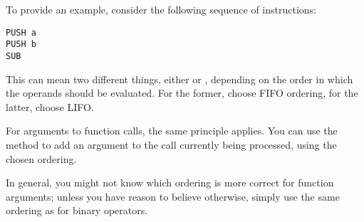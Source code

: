 To provide an example, consider the following sequence of instructions:

\begin{bytecode}
\begin{lstlisting}
PUSH a
PUSH b
SUB
\end{lstlisting}
\end{bytecode}

This can mean two different things, either  or , depending on the order in which the operands should be evaluated. For the former, choose FIFO ordering, for the latter, choose LIFO.

For arguments to function calls, the same principle applies. You can use the  method to add an argument to the call currently being processed, using the chosen ordering.

In general, you might not know which ordering is more correct for function arguments; unless you have reason to believe otherwise, simply use the same ordering as for binary operators.
